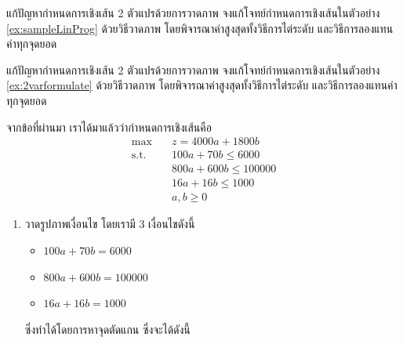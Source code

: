 \newpage
\begin{example}{แก้ปัญหากำหนดการเชิงเส้น 2 ตัวแปรด้วยการวาดภาพ}{}
    จงแก้โจทย์กำหนดการเชิงเส้นในตัวอย่าง \ref{ex:sampleLinProg} ด้วยวิธีวาดภาพ โดยพิจารณาค่าสูงสุดทั้งวิธีการไต่ระดับ และวิธีการลองแทนค่าทุกจุดยอด
\end{example}
\newpage
\begin{example}{แก้ปัญหากำหนดการเชิงเส้น 2 ตัวแปรด้วยการวาดภาพ}{}
    จงแก้โจทย์กำหนดการเชิงเส้นในตัวอย่าง \ref{ex:2varformulate} ด้วยวิธีวาดภาพ โดยพิจารณาค่าสูงสุดทั้งวิธีการไต่ระดับ และวิธีการลองแทนค่าทุกจุดยอด
\end{example}
\begin{solution}
    จากข้อที่ผ่านมา เราได้มาแล้วว่ากำหนดการเชิงเส้นคือ
    \begin{align*}
        \max  &\quad z=4000a + 1800b \\
        \text{s.t.} &\quad100a + 70b \leq 6000\\
                    &\quad800a + 600b \leq 100000\\
                    &\quad16a + 16b \leq 1000\\
                    &\quad a, b\geq0
        \end{align*}
    \begin{enumerate}[label=\textbf{ขั้นที่ \arabic*:}, align=left, labelwidth=5em, labelsep=1em, leftmargin=*, itemsep=16pt, topsep=0pt, parsep=0pt, partopsep=0pt]
    
    \item วาดรูปภาพเงื่อนไข โดยเรามี 3 เงื่อนไขดังนี้
        \begin{itemize}
            \item $100a + 70b = 6000$
            \item $800a + 600b = 100000$
            \item $16a + 16b = 1000$
        \end{itemize}
        ซึ่งทำได้โดยการหาจุดตัดแกน ซึ่งจะได้ดังนี้\\
        

\end{enumerate}
\end{solution}
